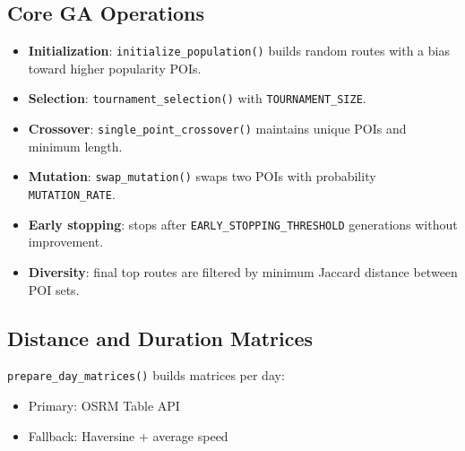 \documentclass[11pt]{article}
\begin{document}
\subsection{Core GA Operations}
\begin{itemize}
  \item \textbf{Initialization}: \texttt{initialize\_population()} builds random routes with a bias toward higher popularity POIs.
  \item \textbf{Selection}: \texttt{tournament\_selection()} with \texttt{TOURNAMENT\_SIZE}.
  \item \textbf{Crossover}: \texttt{single\_point\_crossover()} maintains unique POIs and minimum length.
  \item \textbf{Mutation}: \texttt{swap\_mutation()} swaps two POIs with probability \texttt{MUTATION\_RATE}.
  \item \textbf{Early stopping}: stops after \texttt{EARLY\_STOPPING\_THRESHOLD} generations without improvement.
  \item \textbf{Diversity}: final top routes are filtered by minimum Jaccard distance between POI sets.
\end{itemize}

\subsection{Distance and Duration Matrices}
\texttt{prepare\_day\_matrices()} builds matrices per day:
\begin{itemize}
  \item Primary: OSRM Table API
  \item Fallback: Haversine + average speed
\end{itemize}
\end{document}
